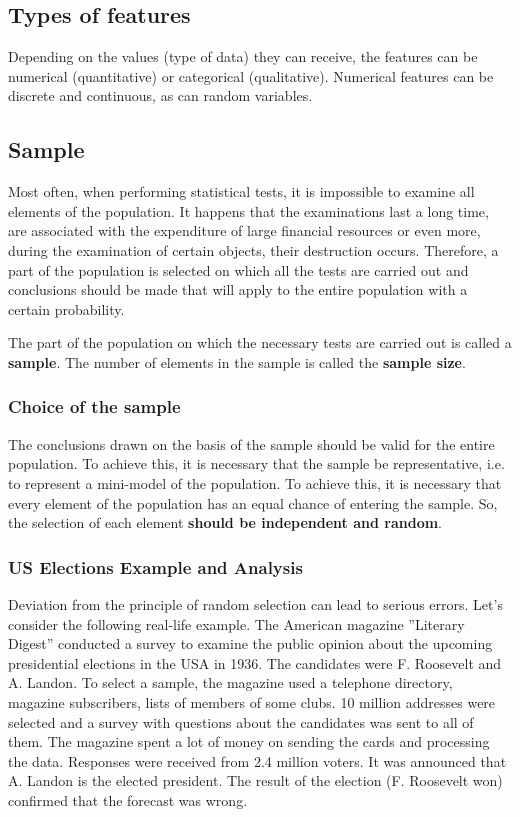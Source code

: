 \documentclass[a4paper, 12pt]{article}
\begin{document}
\subsection{Types of features}

Depending on the values (type of data) they can receive, the features can be numerical
(quantitative) or categorical (qualitative). Numerical features can be discrete and
continuous, as can random variables.

\subsection{Sample}


Most often, when performing statistical tests, it is impossible to examine all elements of the population. It happens that the examinations last a long time, are associated with the expenditure of large financial resources or even more, during the examination of certain objects, their destruction occurs. Therefore, a part of the population is selected on which all the tests are carried out and conclusions should be made that will apply to the entire population with a certain probability.

The part of the population on which the necessary tests are carried out is called a
\textbf{sample}. The number of elements in the sample is called the \textbf{sample size}.

\subsubsection{Choice of the sample}

The conclusions drawn on the basis of the sample should be valid for the entire
population. To achieve this, it is necessary that the sample be representative, i.e. to represent a mini-model of the population. To achieve this, it is necessary that every element of the population has an equal chance of entering the sample. So, the selection of each element \textbf{should be independent and random}.

\subsubsection{US Elections Example and Analysis}

Deviation from the principle of random selection can lead to serious errors. Let’s
consider the following real-life example. The American magazine ”Literary Digest”
conducted a survey to examine the public opinion about the upcoming presidential
elections in the USA in 1936. The candidates were F. Roosevelt and A. Landon. To
select a sample, the magazine used a telephone directory, magazine subscribers, lists of members of some clubs. 10 million addresses were selected and a survey with questions about the candidates was sent to all of them. The magazine spent a lot of money on sending the cards and processing the data. Responses were received from 2.4 million voters. It was announced that A. Landon is the elected president. The result of the election (F. Roosevelt won) confirmed that the forecast was wrong. \\
\end{document}
